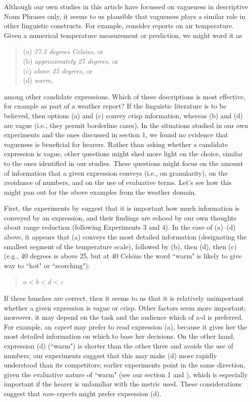 \documentclass[%
man,		%
floatsintext,%
apacite%
]{apa6} %
\begin{document}
Although our own studies in this article have focussed on vagueness in descriptive Noun Phrases only, it seems to us plausible that vagueness plays a similar role in other
linguistic constructs. For example, consider reports on air temperature. Given a numerical
temperature measurement or prediction, we might word it as 
%
\begin{quote}
(a) {\em 27.2 degrees Celsius}, or\\
(b) {\em approximately 27 degrees}, or\\
(c) {\em above 25 degrees}, or\\
(d) {\em warm}, 
\end{quote}
%
among other candidate expressions. Which of these descriptions is most effective, for example as part of a weather report? If the linguistic literature is to be believed, then options (a) and (c) convey crisp information, whereas (b) and (d) are vague (i.e., they permit borderline cases). In the situations studied in our own experiments and the ones discussed in section 1, we found no evidence that vagueness is beneficial for hearers. Rather than asking whether a candidate expression is vague, other questions might shed more light on the choice, similar to the ones identified in our studies. These questions might focus on the amount of information that a given expression conveys (i.e., on granularity), on the avoidance of numbers, and on the use of evaluative terms. Let's see how this might pan out for the above examples from the weather domain.

First, the experiments by \citeauthor{Mishra01042011} suggest that it is important how much information is conveyed by an expression, and their findings are echoed by our own thoughts about range reduction (following Experiments 3 and 4). In the case of (a)--(d) above, it appears that (a) conveys the most detailed information (designating the smallest segment of the temperature scale), followed by (b), then (d), then (c) (e.g., 40 degrees is above 25, but at 40 Celsius the word ``warm" is likely to give way to ``hot" or ``scorching"): 
%
\begin{quote}
$a < b < d < c$
\end{quote}
%
If these hunches are correct, then it seems to us that it is relatively unimportant whether a given expression is vague or crisp. Other factors seem more important; moreover, it may depend on the task and the audience which of a-d is preferred. For example, an \emph{expert} may prefer to read expression (a), because it gives her the most detailed information on which to base her decisions. On the other hand, expression (d) (``warm") is shorter than the other three and avoids the use of numbers; our experiments suggest that this may make (d) more rapidly understood than its competitors; earlier experiments point in the same direction, given the evaluative nature of ``warm" (see our section 1 and  ), which is especially important if the hearer is unfamiliar with the metric used. These considerations suggest that {\em non-experts} might prefer expression (d). 
\end{document}
